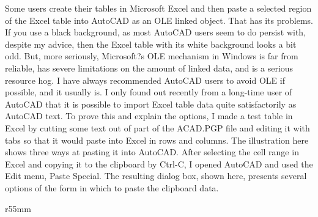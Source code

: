 \documentclass[a4paper]{article}
\begin{document}
Some users create their tables in Microsoft Excel and then paste a selected region of the Excel table into AutoCAD as an OLE linked object. That has its problems. If you use a black background, as most AutoCAD users seem to do persist with, despite my advice, then the Excel table with its white background looks a bit odd. But, more seriously, Microsoft?s OLE mechanism in Windows is far from reliable, has severe limitations on the amount of linked data, and is a serious resource hog. I have always recommended AutoCAD users to avoid OLE if possible, and it usually is.
I only found out recently from a long-time user of AutoCAD that it is possible to import Excel table data quite satisfactorily as AutoCAD text. To prove this and explain the options, I made a test table in Excel by cutting some text out of part of the ACAD.PGP file and editing it with tabs so that it would paste into Excel in rows and columns. The illustration here shows three ways at pasting it into AutoCAD. After selecting the cell range in Excel and copying it to the clipboard by Ctrl-C, I opened AutoCAD and used the Edit menu, Paste Special. The resulting dialog box, shown here, presents several options of the form in which to paste the clipboard data.

\begin{wrapfigure}{r}{55mm}
\end{wrapfigure}
\end{document}
